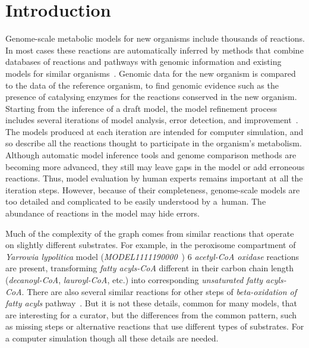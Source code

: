 \documentclass[9pt]{article}
\newcounter{rm}
\begin{document}
\section*{Introduction}
Genome-scale metabolic models for new organisms include thousands of reactions. In most cases these reactions are automatically inferred by methods that combine databases of reactions and pathways with genomic information and existing models for similar organisms~\citep{Swainston2011}. Genomic data for the new organism is compared to the data of the reference organism, to find genomic evidence such as the presence of catalysing enzymes for the reactions conserved in the new organism. Starting from the inference of a draft model, the model refinement process includes several iterations of model analysis, error detection, and improvement~\citep{Thiele2010}. The models produced at each iteration are intended for computer simulation, and so describe all the reactions thought to participate in the organism's metabolism. Although automatic model inference tools and genome comparison methods are becoming more advanced, they still may leave gaps in the model or add erroneous reactions. Thus, model evaluation by human experts remains important at all the iteration steps. However, because of their completeness, genome-scale models are too detailed and complicated to be easily understood by a~human. The abundance of reactions in the model may hide errors.


Much of the complexity of the graph comes from similar reactions that operate on slightly different substrates. For example, in the peroxisome compartment of \emph{Yarrowia lypolitica} model (\emph{MODEL1111190000}~\citep{Loira12}) 6 \emph{acetyl-CoA oxidase} reactions are present, transforming \emph{fatty acyls-CoA} different in their carbon chain length (\emph{decanoyl-CoA}, \emph{lauroyl-CoA}, etc.) into corresponding \emph{unsaturated fatty acyls-CoA}. There are also several similar reactions for other steps of \emph{beta-oxidation of fatty acyls} pathway~\citep{Metzler01}. But it is not these details, common for many models, that are interesting for a curator, but the differences from the common pattern, such as missing steps or alternative reactions that use different types of substrates. For a computer simulation though all these details are needed.


\end{document}
